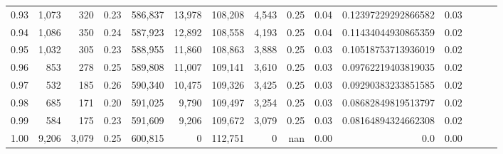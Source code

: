 \begin{tabular}{rrrrrrrrrrrrrrr}
0.93 &   1,073 &    320 &  0.23 &  586,837 &   13,978 &  108,208 &    4,543 &  0.25 &  0.04 &  0.12397229292866582 &      0.03 \\
0.94 &   1,086 &    350 &  0.24 &  587,923 &   12,892 &  108,558 &    4,193 &  0.25 &  0.04 &  0.11434044930865359 &      0.02 \\
0.95 &   1,032 &    305 &  0.23 &  588,955 &   11,860 &  108,863 &    3,888 &  0.25 &  0.03 &  0.10518753713936019 &      0.02 \\
0.96 &     853 &    278 &  0.25 &  589,808 &   11,007 &  109,141 &    3,610 &  0.25 &  0.03 &  0.09762219403819035 &      0.02 \\
0.97 &     532 &    185 &  0.26 &  590,340 &   10,475 &  109,326 &    3,425 &  0.25 &  0.03 &  0.09290383233851585 &      0.02 \\
0.98 &     685 &    171 &  0.20 &  591,025 &    9,790 &  109,497 &    3,254 &  0.25 &  0.03 &  0.08682849819513797 &      0.02 \\
0.99 &     584 &    175 &  0.23 &  591,609 &    9,206 &  109,672 &    3,079 &  0.25 &  0.03 &  0.08164894324662308 &      0.02 \\
1.00 &   9,206 &  3,079 &  0.25 &  600,815 &        0 &  112,751 &        0 &   nan &  0.00 &                  0.0 &      0.00 \\
\bottomrule
\end{tabular}
